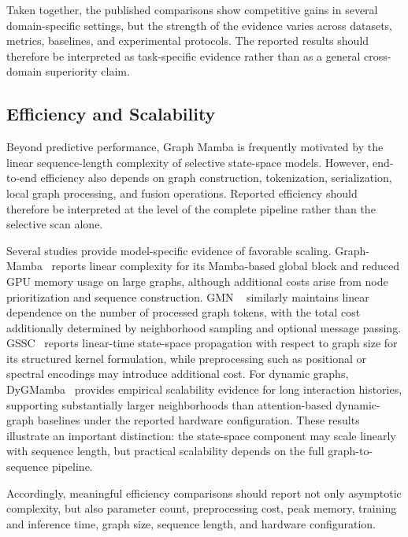 \documentclass[acmsmall]{acmart}
\begin{document}
Taken together, the published comparisons show competitive gains in several
domain-specific settings, but the strength of the evidence varies across
datasets, metrics, baselines, and experimental protocols. The reported results
should therefore be interpreted as task-specific evidence rather than as a
general cross-domain superiority claim.

\subsection{Efficiency and Scalability}
\label{sec:efficiency-eval}

Beyond predictive performance, Graph Mamba is frequently motivated by the
linear sequence-length complexity of selective state-space models. However,
end-to-end efficiency also depends on graph construction, tokenization,
serialization, local graph processing, and fusion operations. Reported
efficiency should therefore be interpreted at the level of the complete
pipeline rather than the selective scan alone.

Several studies provide model-specific evidence of favorable scaling.
Graph-Mamba~\cite{wang2024graph} reports linear complexity for its Mamba-based
global block and reduced GPU memory usage on large graphs, although additional
costs arise from node prioritization and sequence construction. GMN
~\cite{behrouz2024graph} similarly maintains linear dependence on the number of
processed graph tokens, with the total cost additionally determined by
neighborhood sampling and optional message passing. GSSC~\cite{huang2024can}
reports linear-time state-space propagation with respect to graph size for its
structured kernel formulation, while preprocessing such as positional or
spectral encodings may introduce additional cost. 
For dynamic graphs, DyGMamba~\cite{ding2024dygmamba} provides empirical
scalability evidence for long interaction histories, supporting substantially
larger neighborhoods than attention-based dynamic-graph baselines under the
reported hardware configuration. These results illustrate an important
distinction: the state-space component may scale linearly with sequence length,
but practical scalability depends on the full graph-to-sequence pipeline.

Accordingly, meaningful efficiency comparisons should report not only
asymptotic complexity, but also parameter count, preprocessing cost, peak
memory, training and inference time, graph size, sequence length, and hardware
configuration.
\end{document}
